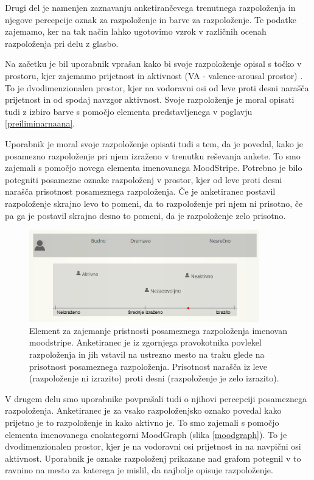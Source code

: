 \documentclass[a4paper, 12pt]{book}
\begin{document}
{Drugi del je namenjen zaznavanju anketirančevega trenutnega razpoloženja in njegove percepcije oznak za razpoloženje in barve za razpoloženje. Te podatke zajemamo, ker na tak način lahko ugotovimo vzrok v različnih ocenah razpoloženja pri delu z glasbo. 

Na začetku je bil uporabnik vprašan kako bi svoje razpoloženje opisal s točko v prostoru, kjer zajemamo prijetnost in aktivnost (VA - valence-arousal prostor) \cite{Colibazzi2010}. To je dvodimenzionalen prostor, kjer na vodoravni osi od leve proti desni narašča prijetnost in od spodaj navzgor aktivnost. Svoje razpoloženje je moral opisati tudi z izbiro barve s pomočjo elementa predstavljenega v poglavju \ref{preiliminarnaana}. 

Uporabnik je moral svoje razpoloženje opisati tudi s tem, da je povedal, kako je posamezno razpoloženje pri njem izraženo v trenutku reševanja ankete. To smo zajemali s pomočjo novega elementa imenovanega MoodStripe. Potrebno je bilo potegniti posamezne oznake razpoloženj v prostor, kjer od leve proti desni narašča prisotnost posameznega razpoloženja. Če je anketiranec postavil razpoloženje skrajno levo to pomeni, da to razpoloženje pri njem ni prisotno, če pa ga je postavil skrajno desno to pomeni, da je razpoloženje zelo prisotno.

\begin{figure}[ht]
\centering
\includegraphics[width=10cm]{images/moodstripe.png}

\caption{Element za zajemanje pristnosti posameznega razpoloženja imenovan moodstripe. Anketiranec je iz zgornjega pravokotnika povlekel razpoloženja in jih vstavil na ustrezno mesto na traku glede na prisotnost posameznega razpoloženja. Prisotnost narašča iz leve (razpoloženje ni izrazito) proti desni (razpoloženje je zelo izrazito). }
\label{moodstripe}
\end{figure}

V drugem delu smo uporabnike povprašali tudi o njihovi percepciji posameznega razpoloženja. Anketiranec je za vsako razpoloženjsko oznako povedal kako prijetno je to razpoloženje in kako aktivno je. To smo zajemali s pomočjo elementa imenovanega enokategorni MoodGraph (slika \ref{moodgraph}). To je dvodimenzionalen prostor, kjer je na vodoravni osi prijetnost in na navpični osi aktivnost. Uporabnik je oznake razpoloženj prikazane nad grafom potegnil v to ravnino na mesto za katerega je mislil, da najbolje opisuje razpoloženje. 

}
\end{document}
